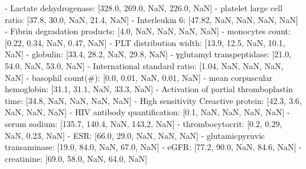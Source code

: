 \begin{tcolorbox}[colback=cadmiumgreen!5!white,colframe=forestgreen!75!white,breakable,title=\textit{Basic setting prompt template for the mortality prediction task on the TJH.}]
\begin{VerbatimWrap}
- Lactate dehydrogenase: [328.0, 269.0, NaN, 226.0, NaN]
- platelet large cell ratio: [37.8, 30.0, NaN, 21.4, NaN]
- Interleukin 6: [47.82, NaN, NaN, NaN, NaN]
- Fibrin degradation products: [4.0, NaN, NaN, NaN, NaN]
- monocytes count: [0.22, 0.34, NaN, 0.47, NaN]
- PLT distribution width: [13.9, 12.5, NaN, 10.1, NaN]
- globulin: [33.4, 28.2, NaN, 29.8, NaN]
- γglutamyl transpeptidase: [21.0, 54.0, NaN, 53.0, NaN]
- International standard ratio: [1.04, NaN, NaN, NaN, NaN]
- basophil count(#): [0.0, 0.01, NaN, 0.01, NaN]
- mean corpuscular hemoglobin: [31.1, 31.1, NaN, 33.3, NaN]
- Activation of partial thromboplastin time: [34.8, NaN, NaN, NaN, NaN]
- High sensitivity Creactive protein: [42.3, 3.6, NaN, NaN, NaN]
- HIV antibody quantification: [0.1, NaN, NaN, NaN, NaN]
- serum sodium: [135.7, 140.4, NaN, 143.2, NaN]
- thrombocytocrit: [0.2, 0.29, NaN, 0.23, NaN]
- ESR: [66.0, 29.0, NaN, NaN, NaN]
- glutamicpyruvic transaminase: [19.0, 84.0, NaN, 67.0, NaN]
- eGFR: [77.2, 90.0, NaN, 84.6, NaN]
- creatinine: [69.0, 58.0, NaN, 64.0, NaN]
\end{VerbatimWrap}
\end{tcolorbox}